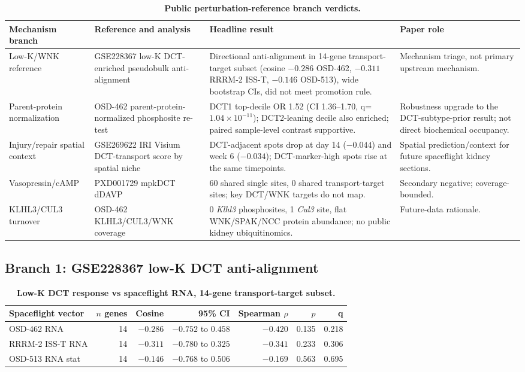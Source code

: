 \documentclass[10pt]{article}
\newcommand{\gene}[1]{\textit{#1}}
\begin{document}
\begin{table}[H]
\centering\small
\caption{\textbf{Public perturbation-reference branch verdicts.}}
\label{tab:triagebranches}
\begin{tabularx}{\textwidth}{p{}p{}Xp{}}
\toprule
Mechanism branch & Reference and analysis & Headline result & Paper role \\
\midrule
Low-K/WNK reference & GSE228367 low-K DCT-enriched pseudobulk anti-alignment & Directional anti-alignment in 14-gene transport-target subset (cosine $-0.286$ OSD-462, $-0.311$ RRRM-2 ISS-T, $-0.146$ OSD-513), wide bootstrap CIs, did not meet promotion rule. & Mechanism triage, not primary upstream mechanism. \\
Parent-protein normalization & OSD-462 parent-protein-normalized phosphosite re-test & DCT1 top-decile OR 1.52 (CI 1.36--1.70, q=$1.04\times10^{-11}$); DCT2-leaning decile also enriched; paired sample-level contrast supportive. & Robustness upgrade to the DCT-subtype-prior result; not direct biochemical occupancy. \\
Injury/repair spatial context & GSE269622 IRI Visium DCT-transport score by spatial niche & DCT-adjacent spots drop at day 14 ($-0.044$) and week 6 ($-0.034$); DCT-marker-high spots rise at the same timepoints. & Spatial prediction/context for future spaceflight kidney sections. \\
Vasopressin/cAMP & PXD001729 mpkDCT dDAVP & 60 shared single sites, 0 shared transport-target sites; key DCT/WNK targets do not map. & Secondary negative; coverage-bounded. \\
KLHL3/CUL3 turnover & OSD-462 KLHL3/CUL3/WNK coverage & 0 \gene{Klhl3} phosphosites, 1 \gene{Cul3} site, flat WNK/SPAK/NCC protein abundance; no public kidney ubiquitinomics. & Future-data rationale. \\
\bottomrule
\end{tabularx}
\end{table}

\subsection{Branch 1: GSE228367 low-K DCT anti-alignment}

\begin{table}[H]
\centering\small
\caption{\textbf{Low-K DCT response vs spaceflight RNA, 14-gene transport-target subset.}}
\label{tab:lowktargets}
\begin{tabular}{lrrrrrr}
\toprule
Spaceflight vector & $n$ genes & Cosine & 95\% CI & Spearman $\rho$ & $p$ & q \\
\midrule
OSD-462 RNA & 14 & $-0.286$ & $-0.752$ to $0.458$ & $-0.420$ & 0.135 & 0.218 \\
RRRM-2 ISS-T RNA & 14 & $-0.311$ & $-0.780$ to $0.325$ & $-0.341$ & 0.233 & 0.306 \\
OSD-513 RNA stat & 14 & $-0.146$ & $-0.768$ to $0.506$ & $-0.169$ & 0.563 & 0.695 \\
\bottomrule
\end{tabular}
\end{table}
\end{document}

